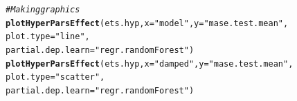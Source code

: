 \documentclass[12pt]{article}\usepackage[]{graphicx}\usepackage[]{color}
\makeatletter
\newcommand{\hlstr}[1]{\textcolor[rgb]{0.192,0.494,0.8}{#1}}%
\newcommand{\hlcom}[1]{\textcolor[rgb]{0.678,0.584,0.686}{\textit{#1}}}%
\newcommand{\hlstd}[1]{\textcolor[rgb]{0.345,0.345,0.345}{#1}}%
\newcommand{\hlkwc}[1]{\textcolor[rgb]{0.333,0.667,0.333}{#1}}%
\newcommand{\hlkwd}[1]{\textcolor[rgb]{0.737,0.353,0.396}{\textbf{#1}}}%
\newenvironment{kframe}{%
 \def\at@end@of@kframe{}%
 \ifinner\ifhmode%
  \def\at@end@of@kframe{\end{minipage}}%
  \begin{minipage}{\columnwidth}%
 \fi\fi%
 \def\FrameCommand##1{\hskip\@totalleftmargin \hskip-\fboxsep
 \colorbox{shadecolor}{##1}\hskip-\fboxsep
     \hskip-\linewidth \hskip-\@totalleftmargin \hskip\columnwidth}%
 \MakeFramed {\advance\hsize-\width
   \@totalleftmargin\z@ \linewidth\hsize
   \@setminipage}}%
 {\par\unskip\endMakeFramed%
 \at@end@of@kframe}
\newenvironment{knitrout}{}{} %
\theoremstyle{definition}
\makeatother
\begin{document}
\begin{knitrout}
\color{fgcolor}\begin{kframe}
\begin{alltt}
\hlcom{# Making graphics}
\hlkwd{plotHyperParsEffect}\hlstd{(ets.hyp,} \hlkwc{x}\hlstd{=} \hlstr{"model"}\hlstd{,} \hlkwc{y} \hlstd{=} \hlstr{"mase.test.mean"}\hlstd{,}
                     \hlkwc{plot.type} \hlstd{=} \hlstr{"line"}\hlstd{,}
                     \hlkwc{partial.dep.learn} \hlstd{=} \hlstr{"regr.randomForest"}\hlstd{)}
\hlkwd{plotHyperParsEffect}\hlstd{(ets.hyp,} \hlkwc{x}\hlstd{=} \hlstr{"damped"}\hlstd{,} \hlkwc{y} \hlstd{=} \hlstr{"mase.test.mean"}\hlstd{,}
                     \hlkwc{plot.type} \hlstd{=} \hlstr{"scatter"}\hlstd{,}
                     \hlkwc{partial.dep.learn} \hlstd{=} \hlstr{"regr.randomForest"}\hlstd{)}
\end{alltt}
\end{kframe}
\end{knitrout}
\end{document}
